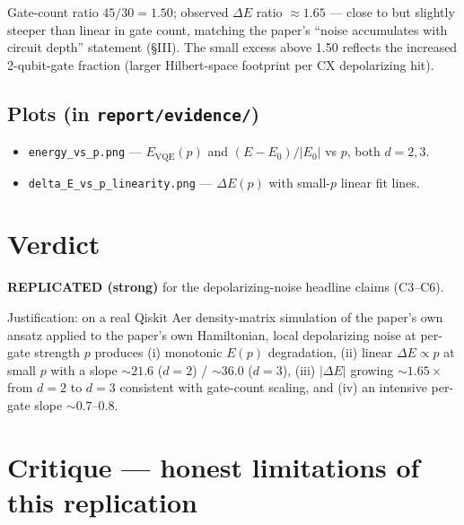 \documentclass[11pt]{article}
\begin{document}
Gate-count ratio $45/30 = 1.50$; observed $\Delta E$ ratio $\approx 1.65$ --- close to but slightly
steeper than linear in gate count, matching the paper's ``noise accumulates with circuit depth''
statement (\S III). The small excess above 1.50 reflects the increased 2-qubit-gate fraction (larger
Hilbert-space footprint per CX depolarizing hit).

\subsection{Plots (in \texttt{report/evidence/})}
\begin{itemize}
\item \texttt{energy\_vs\_p.png} --- $E_{\text{VQE}}(p)$ and $(E-E_0)/|E_0|$ vs $p$, both $d=2, 3$.
\item \texttt{delta\_E\_vs\_p\_linearity.png} --- $\Delta E(p)$ with small-$p$ linear fit lines.
\end{itemize}

\section{Verdict}
\textbf{REPLICATED (strong)} for the depolarizing-noise headline claims (C3--C6).

Justification: on a real Qiskit Aer density-matrix simulation of the paper's own ansatz applied to the
paper's own Hamiltonian, local depolarizing noise at per-gate strength $p$ produces
(i) monotonic $E(p)$ degradation, (ii) linear $\Delta E \propto p$ at small $p$ with a slope $\sim 21.6$
($d=2$) / $\sim 36.0$ ($d=3$), (iii) $|\Delta E|$ growing $\sim 1.65\times$ from $d=2$ to $d=3$
consistent with gate-count scaling, and (iv) an intensive per-gate slope $\sim 0.7$--$0.8$.

\section{Critique --- honest limitations of this replication}
\end{document}
